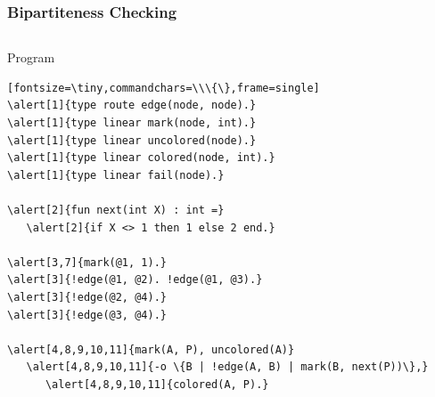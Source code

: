 \documentclass{beamer}
\let\oldalert\alert
\renewcommand{\alert}[2][]{%
  \if\relax\detokenize{#1}\relax%
    \oldalert{#2}%
  \else
    \oldalert<#1>{#2}%
  \fi}
\begin{document}
\begin{frame}[fragile]
  \frametitle{Bipartiteness Checking}
  \begin{columns}[t]
     \begin{block}{Program}
       \begin{verbatim}[fontsize=\tiny,commandchars=\\\{\},frame=single]
\alert[1]{type route edge(node, node).}
\alert[1]{type linear mark(node, int).}
\alert[1]{type linear uncolored(node).}
\alert[1]{type linear colored(node, int).}
\alert[1]{type linear fail(node).}

\alert[2]{fun next(int X) : int =}
   \alert[2]{if X <> 1 then 1 else 2 end.}

\alert[3,7]{mark(@1, 1).}
\alert[3]{!edge(@1, @2). !edge(@1, @3).}
\alert[3]{!edge(@2, @4).}
\alert[3]{!edge(@3, @4).}

\alert[4,8,9,10,11]{mark(A, P), uncolored(A)}
   \alert[4,8,9,10,11]{-o \{B | !edge(A, B) | mark(B, next(P))\},}
      \alert[4,8,9,10,11]{colored(A, P).}


\end{verbatim}
\end{block}
\end{columns}
\end{frame}
\end{document}

